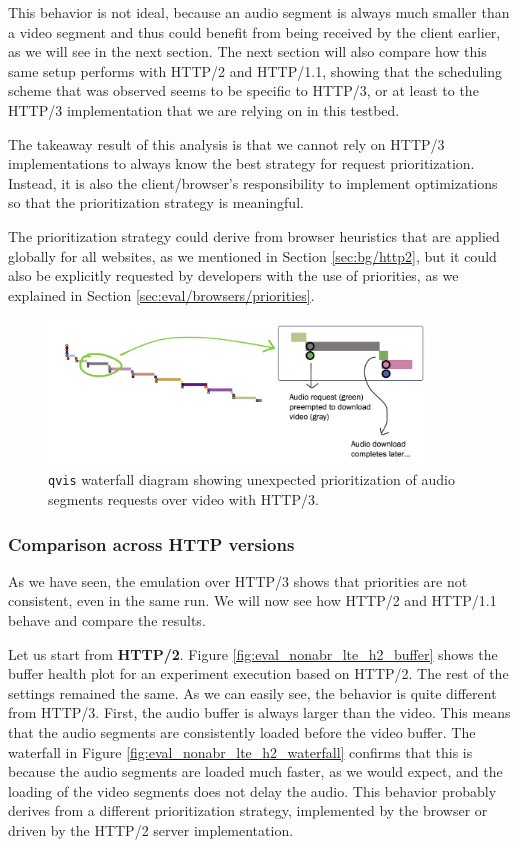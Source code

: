 This behavior is not ideal, because an audio segment is always much smaller than a video segment and thus could benefit from being received by the client earlier, as we will see in the next section. The next section will also compare how this same setup performs with HTTP/2 and HTTP/1.1, showing that the scheduling scheme that was observed seems to be specific to HTTP/3, or at least to the HTTP/3 implementation that we are relying on in this testbed.

The takeaway result of this analysis is that we cannot rely on HTTP/3 implementations to always know the best strategy for request prioritization. Instead, it is also the client/browser's responsibility to implement optimizations so that the prioritization strategy is meaningful.

The prioritization strategy could derive from browser heuristics that are applied globally for all websites, as we mentioned in Section \ref{sec:bg/http2}, but it could also be explicitly requested by developers with the use of priorities, as we explained in Section \ref{sec:eval/browsers/priorities}.

\begin{figure}[h]
    \centering
    \includegraphics[width=0.9\textwidth]{res/eval_nonabr_qvis2.png}
    \caption{\texttt{qvis} waterfall diagram showing unexpected prioritization of audio segments requests over video with HTTP/3.}
    \label{fig:eval_noabr_qvis2}
\end{figure}

\subsubsection{Comparison across HTTP versions}
\label{sec:eval/non-abr/http-versions}

As we have seen, the emulation over HTTP/3 shows that priorities are not consistent, even in the same run. We will now see how HTTP/2 and HTTP/1.1 behave and compare the results.

Let us start from \textbf{HTTP/2}. Figure \ref{fig:eval_nonabr_lte_h2_buffer} shows the buffer health plot for an experiment execution based on HTTP/2. The rest of the settings remained the same. As we can easily see, the behavior is quite different from HTTP/3. First, the audio buffer is always larger than the video. This means that the audio segments are consistently loaded before the video buffer. The waterfall in Figure \ref{fig:eval_nonabr_lte_h2_waterfall} confirms that this is because the audio segments are loaded much faster, as we would expect, and the loading of the video segments does not delay the audio. This behavior probably derives from a different prioritization strategy, implemented by the browser or driven by the HTTP/2 server implementation.

